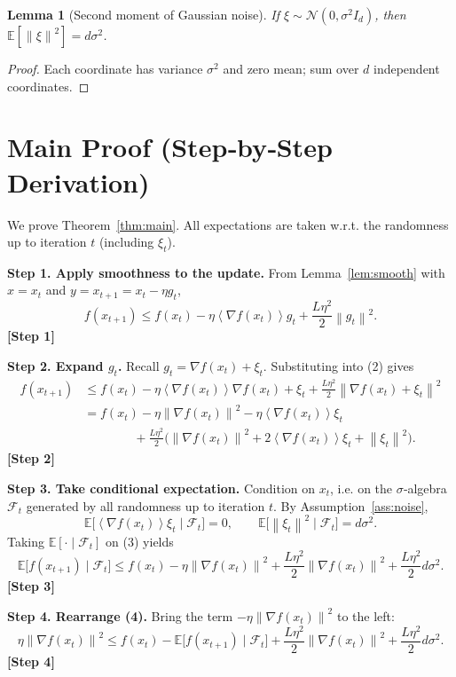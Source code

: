 \documentclass{article}
\newtheorem{lemma}{Lemma}
\newcommand{\E}{\mathbb{E}}
\newcommand{\norm}[1]{\left\|#1\right\|}
\newcommand{\inner}[1]{\left\langle #1 \right\rangle}
\begin{document}
\begin{lemma}[Second moment of Gaussian noise]\label{lem:gauss}
If $\xi\sim\mathcal{N}(0,\sigma^{2}I_{d})$, then $\E[\norm{\xi}^{2}] = d\sigma^{2}$.
\end{lemma}
\begin{proof}
Each coordinate has variance $\sigma^{2}$ and zero mean; sum over $d$ independent coordinates. \qedhere
\end{proof}

\section*{Main Proof (Step‑by‑Step Derivation)}
We prove Theorem~\ref{thm:main}. All expectations are taken w.r.t. the randomness up to iteration $t$ (including $\xi_{t}$).  

\noindent\textbf{Step 1. Apply smoothness to the update.}  
From Lemma~\ref{lem:smooth} with $x=x_{t}$ and $y=x_{t+1}=x_{t}-\eta g_{t}$,
\[
f(x_{t+1})\le f(x_{t})-\eta\inner{\nabla f(x_{t})}{g_{t}}
               +\frac{L\eta^{2}}{2}\norm{g_{t}}^{2}.
\tag{2}
\]
\textbf{[Step 1]}

\noindent\textbf{Step 2. Expand $g_{t}$.}  
Recall $g_{t}= \nabla f(x_{t})+\xi_{t}$. Substituting into (2) gives
\[
\begin{aligned}
f(x_{t+1})
&\le f(x_{t})-\eta\inner{\nabla f(x_{t})}{\nabla f(x_{t})+\xi_{t}}
   +\frac{L\eta^{2}}{2}\norm{\nabla f(x_{t})+\xi_{t}}^{2}\\
&= f(x_{t})-\eta\norm{\nabla f(x_{t})}^{2}
   -\eta\inner{\nabla f(x_{t})}{\xi_{t}} \\
&\qquad\qquad
   +\frac{L\eta^{2}}{2}\Big(\norm{\nabla f(x_{t})}^{2}
          +2\inner{\nabla f(x_{t})}{\xi_{t}}
          +\norm{\xi_{t}}^{2}\Big).
\end{aligned}
\tag{3}
\]
\textbf{[Step 2]}

\noindent\textbf{Step 3. Take conditional expectation.}  
Condition on $x_{t}$, i.e. on the $\sigma$‑algebra $\mathcal{F}_{t}$ generated by all randomness up to iteration $t$. By Assumption~\ref{ass:noise},
\[
\E\!\big[\inner{\nabla f(x_{t})}{\xi_{t}}\mid\mathcal{F}_{t}\big]=0,
\qquad
\E\!\big[\norm{\xi_{t}}^{2}\mid\mathcal{F}_{t}\big]=d\sigma^{2}.
\]
Taking $\E[\cdot\mid\mathcal{F}_{t}]$ on (3) yields
\[
\E\!\big[f(x_{t+1})\mid\mathcal{F}_{t}\big]
\le f(x_{t})-\eta\norm{\nabla f(x_{t})}^{2}
   +\frac{L\eta^{2}}{2}\norm{\nabla f(x_{t})}^{2}
   +\frac{L\eta^{2}}{2}d\sigma^{2}.
\tag{4}
\]
\textbf{[Step 3]}

\noindent\textbf{Step 4. Rearrange (4).}  
Bring the term $-\eta\norm{\nabla f(x_{t})}^{2}$ to the left:
\[
\eta\norm{\nabla f(x_{t})}^{2}
\le f(x_{t})-\E\!\big[f(x_{t+1})\mid\mathcal{F}_{t}\big]
   +\frac{L\eta^{2}}{2}\norm{\nabla f(x_{t})}^{2}
   +\frac{L\eta^{2}}{2}d\sigma^{2}.
\tag{5}
\]
\textbf{[Step 4]}
\end{document}
